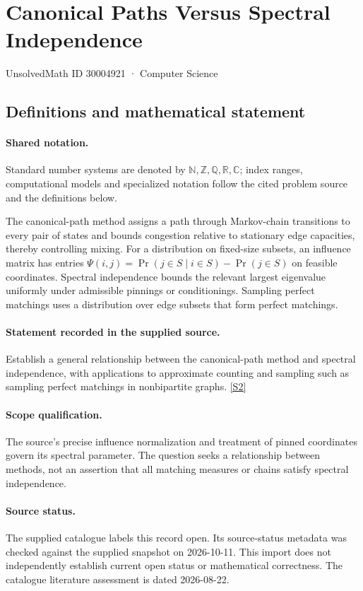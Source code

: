 \documentclass[11pt]{article}
\newcommand{\sref}[2]{\hyperlink{source:#1:#2}{[S#2]}}
\begin{document}
\setcounter{section}{30004920}
\section{Canonical Paths Versus Spectral Independence}\label{30004921}
{\small\sffamily UnsolvedMath ID 30004921 · Computer Science}
\subsection{Definitions and mathematical statement}

\paragraph{Shared notation.}Standard number systems are denoted by $\mathbb N,\mathbb Z,\mathbb Q,\mathbb R,\mathbb C$; index ranges, computational models and specialized notation follow the cited problem source and the definitions below.


The canonical-path method assigns a path through Markov-chain transitions to every pair of states and bounds congestion relative to stationary edge capacities, thereby controlling mixing. For a distribution on fixed-size subsets, an influence matrix has entries $\Psi(i,j)=\Pr(j\in S\mid i\in S)-\Pr(j\in S)$ on feasible coordinates. Spectral independence bounds the relevant largest eigenvalue uniformly under admissible pinnings or conditionings. Sampling perfect matchings uses a distribution over edge subsets that form perfect matchings.
\paragraph{Statement recorded in the supplied source.}
Establish a general relationship between the canonical-path method and spectral independence, with applications to approximate counting and sampling such as sampling perfect matchings in nonbipartite graphs. \sref{30004921}{2}
\paragraph{Scope qualification.}
The source's precise influence normalization and treatment of pinned coordinates govern its spectral parameter. The question seeks a relationship between methods, not an assertion that all matching measures or chains satisfy spectral independence.
\paragraph{Source status.}
The supplied catalogue labels this record open. Its source-status metadata was checked against the supplied snapshot on 2026-10-11. This import does not independently establish current open status or mathematical correctness. The catalogue literature assessment is dated 2026-08-22.
\end{document}
